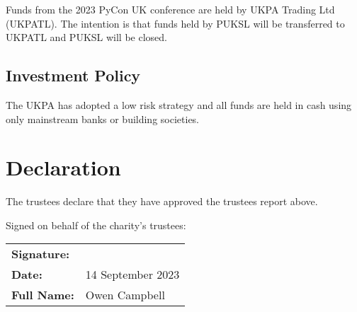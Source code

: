 \documentclass[11pt, final]{article}
\begin{document}
Funds from the 2023 PyCon UK conference are held by UKPA Trading Ltd (UKPATL). The intention is that funds held by PUKSL will be transferred to UKPATL and PUKSL will be closed.

\subsection{Investment Policy}
The UKPA has adopted a low risk strategy and all funds are held in cash using only mainstream banks or building societies.

\section{Declaration}
The trustees declare that they have approved the trustees report above.


Signed on behalf of the charity's trustees:

\begin{tabular}{l l}
	\textbf{Signature:}\vspace{3cm}                       \\
	\textbf{Date:}      & 14 September 2023\vspace{1cm} \\
	\textbf{Full Name:} & Owen Campbell                   \\
\end{tabular}
\end{document}
